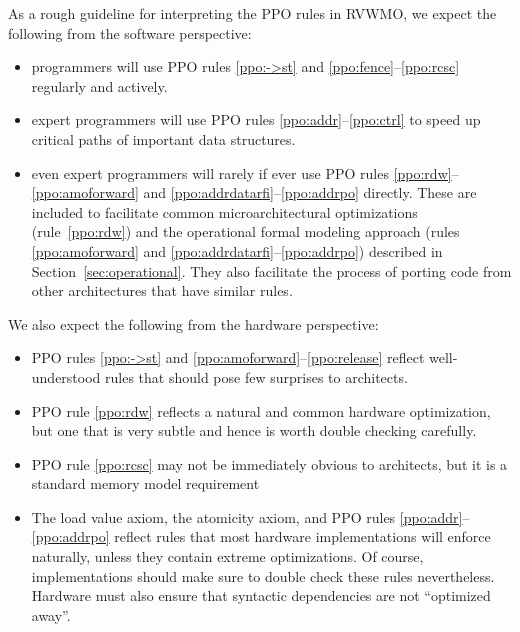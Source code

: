 As a rough guideline for interpreting the PPO rules in RVWMO, we expect the following from the software perspective:
\begin{itemize}
  \item programmers will use PPO rules \ref{ppo:->st} and \ref{ppo:fence}--\ref{ppo:rcsc} regularly and actively.
  \item expert programmers will use PPO rules \ref{ppo:addr}--\ref{ppo:ctrl} to speed up critical paths of important data structures.
  \item even expert programmers will rarely if ever use PPO rules \ref{ppo:rdw}--\ref{ppo:amoforward} and \ref{ppo:addrdatarfi}--\ref{ppo:addrpo} directly.  These are included to facilitate common microarchitectural optimizations (rule~\ref{ppo:rdw}) and the operational formal modeling approach (rules \ref{ppo:amoforward} and \ref{ppo:addrdatarfi}--\ref{ppo:addrpo}) described in Section~\ref{sec:operational}.  They also facilitate the process of porting code from other architectures that have similar rules.
\end{itemize}

We also expect the following from the hardware perspective:
\begin{itemize}
  \item PPO rules \ref{ppo:->st} and \ref{ppo:amoforward}--\ref{ppo:release} reflect well-understood rules that should pose few surprises to architects.
  \item PPO rule \ref{ppo:rdw} reflects a natural and common hardware optimization, but one that is very subtle and hence is worth double checking carefully.
  \item PPO rule \ref{ppo:rcsc} may not be immediately obvious to architects, but it is a standard memory model requirement
  \item The load value axiom, the atomicity axiom, and PPO rules \ref{ppo:addr}--\ref{ppo:addrpo} reflect rules that most hardware implementations will enforce naturally, unless they contain extreme optimizations.  Of course, implementations should make sure to double check these rules nevertheless.  Hardware must also ensure that syntactic dependencies are not ``optimized away''.
\end{itemize}

